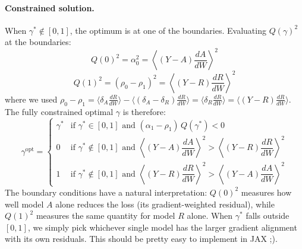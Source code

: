 \documentclass[12pt]{article}
\begin{document}
\paragraph{Constrained solution.} When $\gamma^* \notin [0,1]$, the optimum is
at one of the boundaries. Evaluating $Q(\gamma)^2$ at the boundaries:
\begin{equation}
    Q(0)^2 = \alpha_0^2 = \left\langle (Y - A)\frac{dA}{dW} \right\rangle^2
\end{equation}
\begin{equation}
    Q(1)^2 = (\rho_0 - \rho_1)^2 = \left\langle (Y - R)\frac{dR}{dW} \right\rangle^2
\end{equation}
where we used $\rho_0 - \rho_1 = \langle \delta_A \frac{dR}{dW}\rangle - 
\langle(\delta_A - \delta_R)\frac{dR}{dW}\rangle = \langle \delta_R \frac{dR}{dW}\rangle
= \langle(Y-R)\frac{dR}{dW}\rangle$. The fully constrained optimal $\gamma$ is
therefore:
\begin{equation}
    \gamma^{\text{opt}} = \begin{cases}
        \gamma^* 
        & \text{if } \gamma^* \in [0,1] \text{ and } (\alpha_1-\rho_1)\,Q(\gamma^*) < 0 
        \\[6pt]
        0
        & \text{if } \gamma^* \notin [0,1] \text{ and } 
        \left\langle (Y-A)\dfrac{dA}{dW} \right\rangle^2 
        > \left\langle (Y-R)\dfrac{dR}{dW} \right\rangle^2
        \\[6pt]
        1        
        & \text{if } \gamma^* \notin [0,1] \text{ and } 
        \left\langle (Y-R)\dfrac{dR}{dW} \right\rangle^2 
        > \left\langle (Y-A)\dfrac{dA}{dW} \right\rangle^2
    \end{cases}
\end{equation}
The boundary conditions have a natural interpretation: $Q(0)^2$ measures how
well model $A$ alone reduces the loss (its gradient-weighted residual), while
$Q(1)^2$ measures the same quantity for model $R$ alone. When $\gamma^*$ falls
outside $[0,1]$, we simply pick whichever single model has the larger gradient
alignment with its own residuals. This should be pretty easy to implement in JAX ;).
\end{document}

